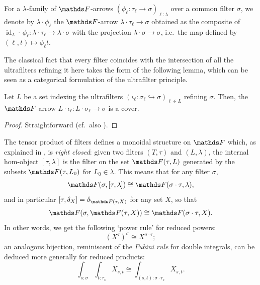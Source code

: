 \begin{nota}\label{rmk:dependent-tensor-products-on-slices}
    For a $\lambda$-family of $\FF$-arrows $(\phi_\ell \colon \tau_\ell \to \sigma)_{\ell :\lambda}$ over a common filter $\sigma$, we denote by $\lambda \cdot \phi_\ell$ the $\FF$-arrow $\lambda \cdot \tau_\ell \to \sigma$ obtained as the composite of $\operatorname{id}_\lambda \cdot\,  \phi_\ell \colon \lambda \cdot \tau_{\ell} \to \lambda \cdot \sigma$ with the projection $\lambda\cdot\sigma\to\sigma$, i.e.\ the map defined by $(\ell, t) \mapsto \phi_\ell t$.
\end{nota}


The classical fact that every filter coincides with the intersection of all the ultrafilters refining it here takes the form of the following lemma, which can be seen as a categorical formulation of the ultrafilter principle.

\begin{lem}\label{lem:cover-by-uf}
    Let $L$ be a set indexing the ultrafilters $(\iota_\ell\colon \sigma_{\ell} \hookrightarrow \sigma)_{\ell \in L}$ refining $\sigma$. Then, the $\FF$-arrow $L\cdot\iota_\ell\colon L\cdot\sigma_\ell\to \sigma$ is a cover.
\begin{proof}
    Straightforward (cf.\ also \cite[Lem.\ 3.4]{awodeyUltrasheavesDoubleNegation2004}).
\end{proof}
\end{lem}


\begin{cons}\label{rmk:monoidal-structure-on-F}
    The tensor product of filters defines a monoidal structure on $\FF$ which, as explained in \cite[\S 4]{blassTwoClosedCategories1977}, is \emph{right closed}: 
    given two filters $(T,\tau)$ and $(L,\lambda)$, the internal hom-object $[\tau, \lambda]$ is the filter on the set $\FF(\tau,L)$ generated by the subsets $\FF(\tau,L_0)$ for $L_0 \in \lambda$. This means that for any filter $\sigma$,
    \[\FF(\sigma,[\tau,\lambda])\cong\FF(\sigma\cdot\tau,\lambda),\]
    and in particular $[\tau, \delta_X] = \delta_{\FF(\tau, X)}$ for any set $X$, so that
    \[ \FF(\sigma, \FF(\tau, X)) \cong \FF(\sigma \cdot \tau , X). \]
    In other words, we get the following `power rule' for reduced powers: 
    \[ (X^\tau)^\sigma \cong X^{\sigma \cdot \tau};\]
    an analogous bijection, reminiscent of the \emph{Fubini rule} for double integrals, can be deduced more generally for reduced products:
    \[\textstyle \int_{s:\sigma} \int_{t:\tau_s} X_{s,t} \cong \int_{(s,t) : \sigma\cdot \tau_s} X_{s,t}.\]
\end{cons}


